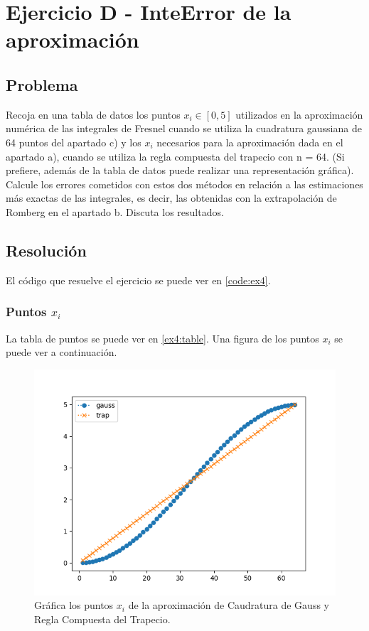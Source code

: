 \section{Ejercicio D - InteError de la aproximación}

\subsection{Problema}

Recoja en una tabla de datos los puntos $x_i \in [0, 5]$ utilizados en la aproximación numérica de las integrales de Fresnel cuando se utiliza la cuadratura gaussiana de 64 puntos del apartado c) y los $x_i$ necesarios para la aproximación dada en el apartado a), cuando se utiliza la regla compuesta del trapecio con n = 64. (Si prefiere, además de la tabla de datos puede realizar una representación gráfica). Calcule los errores cometidos con estos dos métodos en relación a las estimaciones más exactas de las integrales, es decir, las obtenidas con la extrapolación de Romberg en el apartado b. Discuta los resultados.

\subsection{Resolución}


El código que resuelve el ejercicio se puede ver en \ref{code:ex4}. 

\subsubsection{Puntos $x_i$}

La tabla de puntos se puede ver en \ref{ex4:table}. Una figura de los puntos $x_i$ se puede ver a continuación. 

\begin{figure}[h!]
	\centering
	\includegraphics[width=0.8\linewidth]{figures/gauss_trap_xi.png}
	\caption{Gráfica los puntos $x_i$ de la aproximación de Caudratura de Gauss y Regla Compuesta del Trapecio.}
	\label{fig:gauss_trap_xi}
\end{figure}

